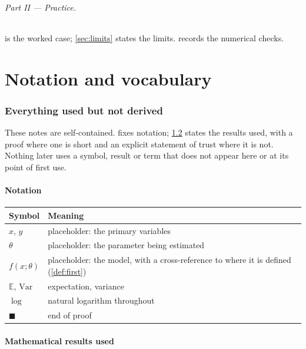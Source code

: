 \documentclass{lecturenotes}
\begin{document}
\paragraph{Part II --- Practice.}  is the worked case;
\cref{sec:limits} states the limits.  records the
numerical checks.

\part{Notation and vocabulary}

\section{Everything used but not derived}\label{sec:everything}

These notes are self-contained.  fixes notation;
\cref{sec:results} states the results used, with a proof where one is short
and an explicit statement of trust where it is not. Nothing later uses a
symbol, result or term that does not appear here or at its point of first
use.

\subsection{Notation}\label{sec:notation}

\begin{tabularx}{\linewidth}{@{}l L@{}}
\toprule
Symbol & Meaning \\
\midrule
$x$, $y$ & placeholder: the primary variables \\ \rowrule
$\theta$ & placeholder: the parameter being estimated \\ \rowrule
$f(x;\theta)$ & placeholder: the model, with a cross-reference to where it is defined (\cref{def:first}) \\ \rowrule
$\mathbb E$, $\mathrm{Var}$ & expectation, variance \\ \rowrule
$\log$ & natural logarithm throughout \\ \rowrule
$\blacksquare$ & end of proof \\
\bottomrule
\end{tabularx}

\subsection{Mathematical results used}\label{sec:results}
\end{document}
